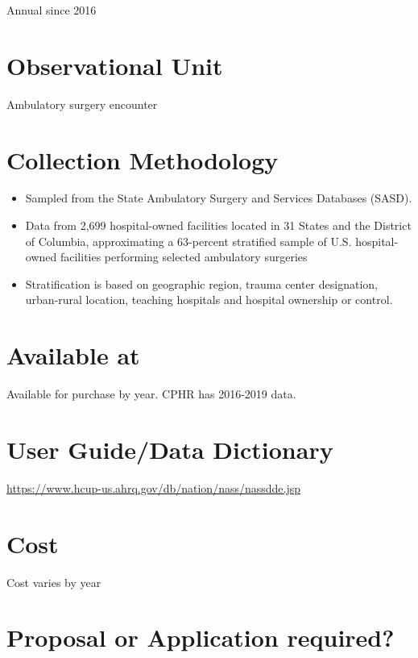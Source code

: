 \documentclass[
]{book}
\providecommand{\tightlist}{%
  \setlength{\itemsep}{0pt}\setlength{\parskip}{0pt}}
\begin{document}
Annual since 2016

\hypertarget{observational-unit-69}{%
\section{Observational Unit}\label{observational-unit-69}}

Ambulatory surgery encounter

\hypertarget{collection-methodology-69}{%
\section{Collection Methodology}\label{collection-methodology-69}}

\begin{itemize}
\tightlist
\item
  Sampled from the State Ambulatory Surgery and Services Databases (SASD).
\item
  Data from 2,699 hospital-owned facilities located in 31 States and the District of Columbia, approximating a 63-percent stratified sample of U.S. hospital-owned facilities performing selected ambulatory surgeries
\item
  Stratification is based on geographic region, trauma center designation, urban-rural location, teaching hospitals and hospital ownership or control.
\end{itemize}

\hypertarget{available-at-69}{%
\section{Available at}\label{available-at-69}}

Available for purchase by year. CPHR has 2016-2019 data.

\hypertarget{user-guidedata-dictionary-69}{%
\section{User Guide/Data Dictionary}\label{user-guidedata-dictionary-69}}

\url{https://www.hcup-us.ahrq.gov/db/nation/nass/nassdde.jsp}

\hypertarget{cost-69}{%
\section{Cost}\label{cost-69}}

Cost varies by year

\hypertarget{proposal-or-application-required-69}{%
\section{Proposal or Application required?}\label{proposal-or-application-required-69}}
\end{document}
